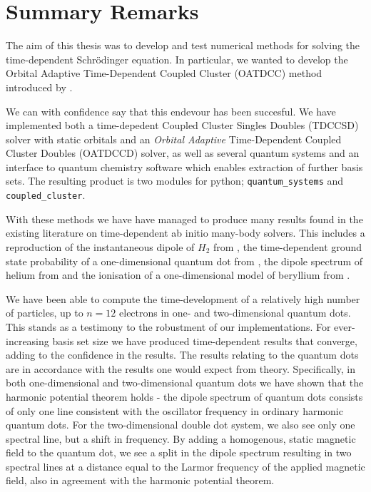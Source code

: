 \chapter{Summary Remarks}

The aim of this thesis was to develop and test numerical methods for 
solving the time-dependent Schrödinger equation. In particular, we 
wanted to develop the Orbital Adaptive Time-Dependent Coupled Cluster 
(OATDCC) method introduced by \citeauthor{kvaal2012ab}\cite{kvaal2012ab}.

We can with confidence say that this endevour has been succesful.
We have implemented both 
a time-depedent Coupled Cluster Singles Doubles (TDCCSD) solver with 
static orbitals and an \emph{Orbital Adaptive} Time-Dependent Coupled Cluster 
Doubles (OATDCCD) solver, as well as several quantum systems and an interface 
to quantum chemistry software which enables extraction of further basis sets.
The resulting product is two modules for python; \lstinline{quantum_systems} 
and \lstinline{coupled_cluster}.

With these methods we have have managed to produce 
many results found in the existing literature on time-dependent ab initio 
many-body solvers. This includes a reproduction of the instantaneous dipole 
of $H_2$ from \citeauthor{li2005time}\cite{li2005time}, the time-dependent 
ground state probability of a one-dimensional quantum dot from 
\citeauthor{Zanghellini04}\cite{Zanghellini04}, the dipole spectrum of 
helium from \citeauthor{pedersen2019symplectic}\cite{pedersen2019symplectic}
and the ionisation of a one-dimensional model of beryllium from 
\citeauthor{miyagi2013time}\cite{miyagi2013time}.

We have been able to compute the time-development 
of a relatively high number of particles, up to $n=12$ electrons in one- and
two-dimensional quantum dots. This stands as a testimony to the robustment 
of our implementations. For ever-increasing basis set size we have produced 
time-dependent results that converge, adding to the confidence in the results.
The results relating to the quantum dots are in accordance with the 
results one would expect from theory. Specifically, in both one-dimensional 
and two-dimensional quantum dots we have shown that the harmonic potential 
theorem\cite{kohn1961cyclotron} holds - the dipole spectrum of quantum 
dots consists of only one line consistent with the oscillator frequency in 
ordinary harmonic quantum dots. For the two-dimensional double dot system,
we also see only one spectral line, but a shift in frequency. By adding a homogenous,
static magnetic field to the quantum dot, we see a split in the dipole spectrum 
resulting in two spectral lines at a distance equal to the Larmor frequency of 
the applied magnetic field, also in agreement with the harmonic potential theorem.

